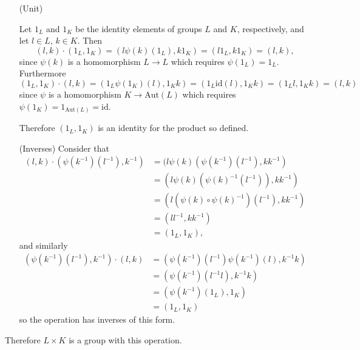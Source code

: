 \documentclass{article}
\begin{document}
\begin{Answer}
\begin{itemize}
{      $(l\psi(k)(l^\prime), k k^\prime) \in L \times K$ and thus the
      set is closed under this operation.
    }
  \item[(Unit)]
    {
      Let $1_L$ and $1_K$ be the identity elements of groups $L$ and
      $K$, respectively, and let $l \in L$, $k \in K$. Then
      $$
      (l, k) \cdot (1_L, 1_K)
    = (l \psi(k)(1_L), k 1_K)
    = (l 1_L, k 1_K)
    = (l, k),
      $$
      since $\psi(k)$ is a homomorphism $L \to L$ which requires
      $\psi(1_L) = 1_L$. Furthermore
      $$
      (1_L, 1_K) \cdot (l, k)
    = (1_L \psi(1_K)(l), 1_K k)
    = (1_L \mathrm{id}(l), 1_K k)
    = (1_L l, 1_K k)
    = (l, k)
      $$
      since $\psi$ is a homomorphism $K \to \mathrm{Aut}(L)$ which 
      requires $\psi(1_K) = 1_{\mathrm{Aut}(L)} = \mathrm{id}$.

      Therefore $(1_L, 1_K)$ is an identity for the product so defined.
    }
    \item[(Inverses)]
      {Consider that
       \begin{align*}
         (l, k) \cdot (\psi(k^{-1})(l^{-1}), k^{-1})
      &= (l \psi(k)(\psi(k^{-1})(l^{-1}), k k^{-1}) \\
      &= (l \psi(k)(\psi(k)^{-1}(l^{-1})), k k^{-1}) \\
      &= (l (\psi(k) \circ \psi(k)^{-1})(l^{-1}), k k^{-1}) \\
      &= (l l^{-1}, k k^{-1}) \\
      &= (1_L, 1_K),
       \end{align*}
       and similarly
       \begin{align*}
          (\psi(k^{-1})(l^{-1}), k^{-1}) \cdot (l, k)
       &= (\psi(k^{-1})(l^{-1}) \psi(k^{-1})(l), k^{-1} k) \\
       &= (\psi(k^{-1})(l^{-1} l), k^{-1} k) \\
       &= (\psi(k^{-1})(1_L), 1_K) \\
       &= (1_L, 1_K)
       \end{align*}
       so the operation has inverses of this form.
      }
\end{itemize}
Therefore $L \times K$ is a group with this operation.
\end{Answer}

\pagebreak
\end{document}
